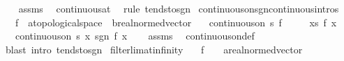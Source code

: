 \begin{isabellebody}
%
\isadelimproof
\ \ %
\endisadelimproof
%
\isatagproof
{}\isamarkupfalse%
\ assms\ \isamarkupfalse%
\ continuous{\isacharunderscore}{\kern0pt}at\ \isamarkupfalse%
\ {\isacharparenleft}{\kern0pt}rule\ tendsto{\isacharunderscore}{\kern0pt}sgn{\isacharparenright}{\kern0pt}%
\endisatagproof
{\isafoldproof}%
%
\isadelimproof
\isanewline
%
\endisadelimproof
\isanewline
{}\isamarkupfalse%
\ continuous{\isacharunderscore}{\kern0pt}on{\isacharunderscore}{\kern0pt}sgn{\isacharbrackleft}{\kern0pt}continuous{\isacharunderscore}{\kern0pt}intros{\isacharbrackright}{\kern0pt}{\isacharcolon}{\kern0pt}\isanewline
\ \ \ f\ {\isacharcolon}{\kern0pt}{\isacharcolon}{\kern0pt}\ {\isachardoublequoteopen}{\isacharprime}{\kern0pt}a{\isacharcolon}{\kern0pt}{\isacharcolon}{\kern0pt}topological{\isacharunderscore}{\kern0pt}space\ {\isasymRightarrow}\ {\isacharprime}{\kern0pt}b{\isacharcolon}{\kern0pt}{\isacharcolon}{\kern0pt}real{\isacharunderscore}{\kern0pt}normed{\isacharunderscore}{\kern0pt}vector{\isachardoublequoteclose}\isanewline
\ \ \ {\isachardoublequoteopen}continuous{\isacharunderscore}{\kern0pt}on\ s\ f{\isachardoublequoteclose}\isanewline
\ \ \ \ \ {\isachardoublequoteopen}{\isasymforall}x{\isasymin}s{\isachardot}{\kern0pt}\ f\ x\ {\isasymnoteq}\ {}{\isachardoublequoteclose}\isanewline
\ \ \ {\isachardoublequoteopen}continuous{\isacharunderscore}{\kern0pt}on\ s\ {\isacharparenleft}{\kern0pt}{\isasymlambda}x{\isachardot}{\kern0pt}\ sgn\ {\isacharparenleft}{\kern0pt}f\ x{\isacharparenright}{\kern0pt}{\isacharparenright}{\kern0pt}{\isachardoublequoteclose}\isanewline
%
\isadelimproof
\ \ %
\endisadelimproof
%
\isatagproof
{}\isamarkupfalse%
\ assms\ \isamarkupfalse%
\ continuous{\isacharunderscore}{\kern0pt}on{\isacharunderscore}{\kern0pt}def\ \isamarkupfalse%
\ {\isacharparenleft}{\kern0pt}blast\ intro{\isacharcolon}{\kern0pt}\ tendsto{\isacharunderscore}{\kern0pt}sgn{\isacharparenright}{\kern0pt}%
\endisatagproof
{\isafoldproof}%
%
\isadelimproof
\isanewline
%
\endisadelimproof
\isanewline
{}\isamarkupfalse%
\ filterlim{\isacharunderscore}{\kern0pt}at{\isacharunderscore}{\kern0pt}infinity{\isacharcolon}{\kern0pt}\isanewline
\ \ \ f\ {\isacharcolon}{\kern0pt}{\isacharcolon}{\kern0pt}\ {\isachardoublequoteopen}{\isacharunderscore}{\kern0pt}\ {\isasymRightarrow}\ {\isacharprime}{\kern0pt}a{\isacharcolon}{\kern0pt}{\isacharcolon}{\kern0pt}real{\isacharunderscore}{\kern0pt}normed{\isacharunderscore}{\kern0pt}vector{\isachardoublequoteclose}\isanewline

\end{isabellebody}
